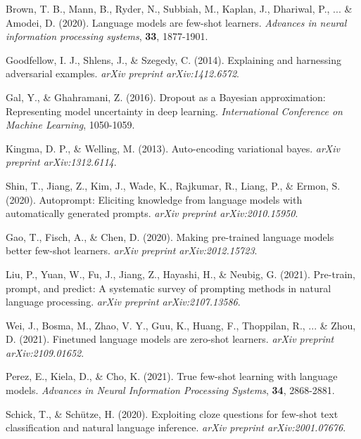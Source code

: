\documentclass{article}
\begin{document}
\begin{thebibliography}{10}

Brown, T. B., Mann, B., Ryder, N., Subbiah, M., Kaplan, J., Dhariwal, P., ... \& Amodei, D. (2020). Language models are few-shot learners. \textit{Advances in neural information processing systems}, \textbf{33}, 1877-1901.

Goodfellow, I. J., Shlens, J., \& Szegedy, C. (2014). Explaining and harnessing adversarial examples. \textit{arXiv preprint arXiv:1412.6572}.

Gal, Y., \& Ghahramani, Z. (2016). Dropout as a Bayesian approximation: Representing model uncertainty in deep learning. \textit{International Conference on Machine Learning}, 1050-1059.

Kingma, D. P., \& Welling, M. (2013). Auto-encoding variational bayes. \textit{arXiv preprint arXiv:1312.6114}.

Shin, T., Jiang, Z., Kim, J., Wade, K., Rajkumar, R., Liang, P., \& Ermon, S. (2020). Autoprompt: Eliciting knowledge from language models with automatically generated prompts. \textit{arXiv preprint arXiv:2010.15950}.

Gao, T., Fisch, A., \& Chen, D. (2020). Making pre-trained language models better few-shot learners. \textit{arXiv preprint arXiv:2012.15723}.

Liu, P., Yuan, W., Fu, J., Jiang, Z., Hayashi, H., \& Neubig, G. (2021). Pre-train, prompt, and predict: A systematic survey of prompting methods in natural language processing. \textit{arXiv preprint arXiv:2107.13586}.

Wei, J., Bosma, M., Zhao, V. Y., Guu, K., Huang, F., Thoppilan, R., ... \& Zhou, D. (2021). Finetuned language models are zero-shot learners. \textit{arXiv preprint arXiv:2109.01652}.

Perez, E., Kiela, D., \& Cho, K. (2021). True few-shot learning with language models. \textit{Advances in Neural Information Processing Systems}, \textbf{34}, 2868-2881.

Schick, T., \& Schütze, H. (2020). Exploiting cloze questions for few-shot text classification and natural language inference. \textit{arXiv preprint arXiv:2001.07676}.

\end{thebibliography}
\end{document}
